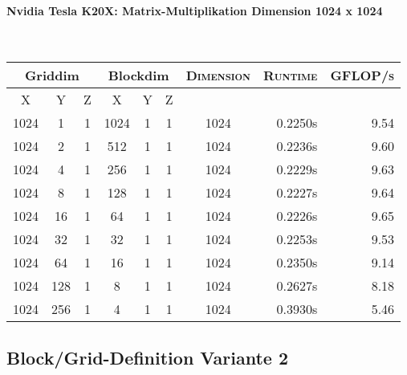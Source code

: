 \paragraph{Nvidia Tesla K20X: Matrix-Multiplikation Dimension 1024 x 1024}\hfill\\
\begin{tabular}{|c|c|c||c|c|c||c|r|r|}
	\hline
	\multicolumn{3}{|c||}{Griddim} & \multicolumn{3}{|c||}{Blockdim} & \textsc{Dimension} & \textsc{Runtime} & \textsc{GFLOP/s} \\
	\hline
	\textsc{X} & \textsc{Y} & \textsc{Z} & \textsc{X} & \textsc{Y} & \textsc{Z} & & & \\
	\hline
	\hline
	1024 & 1 & 1 & 1024 & 1 & 1 & 1024 & 0.2250s  & 9.54 \\ 
	\hline 
	1024 & 2 & 1 & 512 & 1 & 1 & 1024 & 0.2236s  & 9.60 \\ 
	\hline 
	1024 & 4 & 1 & 256 & 1 & 1 & 1024 & 0.2229s  & 9.63 \\ 
	\hline 
	1024 & 8 & 1 & 128 & 1 & 1 & 1024 & 0.2227s  & 9.64 \\ 
	\hline 
	1024 & 16 & 1 & 64 & 1 & 1 & 1024 & 0.2226s  & 9.65 \\ 
	\hline 
	1024 & 32 & 1 & 32 & 1 & 1 & 1024 & 0.2253s  & 9.53 \\ 
	\hline 
	1024 & 64 & 1 & 16 & 1 & 1 & 1024 & 0.2350s  & 9.14 \\ 
	\hline 
	1024 & 128 & 1 & 8 & 1 & 1 & 1024 & 0.2627s  & 8.18 \\ 
	\hline 
	1024 & 256 & 1 & 4 & 1 & 1 & 1024 & 0.3930s  & 5.46 \\ 
	\hline 

\end{tabular}


\subsection{Block/Grid-Definition Variante 2}
\label{lst:a6-kernel}

